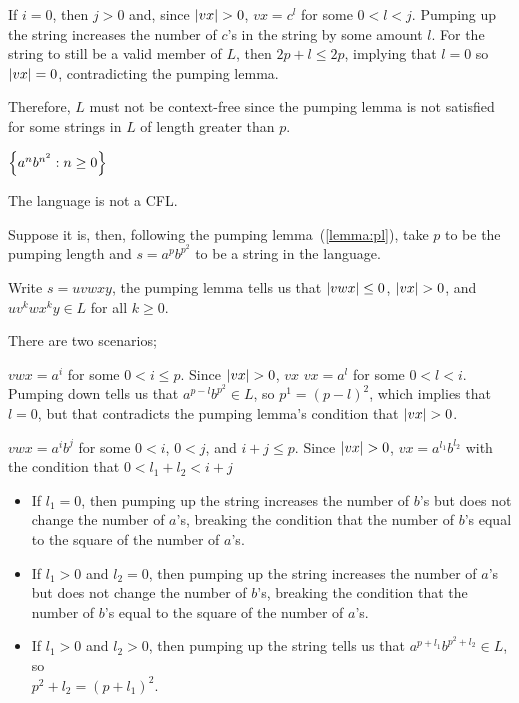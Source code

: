 \begin{problem}
\begin{enumalph}
\begin{Answer}
\begin{enumroman}
        \step
        If $i = 0$, then $j > 0$ and, since $\lvert vx\rvert > 0$, $vx = c^l$ for some
        $0 < l < j$.
        Pumping up the string increases the number of $c$'s in the string by some
        amount $l$. For the string to still be a valid member of $L$,
        then $2p + l \leq 2p$, implying that $l = 0$ so $\lvert vx\rvert = 0$,
        contradicting the pumping lemma.
      \end{enumroman}

      \step
      Therefore, $L$ must not be context-free since the pumping lemma
      is not satisfied for some strings in $L$ of length greater than $p$.
    \end{Answer}
    
    \newpage
    \item $\left\{a^n b^{n^2} : n \ge 0\right\}$
    \begin{Answer}
      The language is not a CFL.

      Suppose it is, then, following the pumping lemma~(\ref{lemma:pl}),
      take $p$ to be the pumping length and $s = a^pb^{p^2}$
      to be a string in the language.

      Write $s = uvwxy$, the pumping lemma tells us that $\lvert vwx\rvert \leq 0$,
      $\lvert vx\rvert > 0$, and $uv^kwx^ky \in L$ for all $k \geq 0$.

      There are two scenarios;
      \begin{enumroman}
        \item $vwx = a^i$ for some $0 < i \leq p$.
          Since $\lvert vx\rvert > 0$, $vx$ $vx = a^l$ for some $0 < l < i$.
          Pumping down tells us that $a^{p-l}b^{p^2} \in L$,
          so $p^1 = (p - l)^2$, which implies that $l = 0$,
          but that contradicts the pumping lemma's condition that
          $\lvert vx\rvert > 0$.
        \item $vwx = a^ib^j$ for some $0 < i$, $0 < j$, and $i + j \leq p$.
          Since $\lvert vx\rvert > 0$, $vx = a^{l_1}b^{l_2}$ with the condition
          that $0 < l_1 + l_2 < i + j$
          
          \begin{itemize}
            \item If $l_1 = 0$, then pumping up the string increases the number of $b$'s
              but does not change the number of $a$'s, breaking the condition
              that the number of $b$'s equal to the square of the number of $a$'s.
            \item If $l_1 > 0$ and $l_2 = 0$, then pumping up the string
              increases the number of $a$'s but does not change the number of $b$'s,
              breaking the condition that the number of $b$'s equal to the square
              of the number of $a$'s.
            \item If $l_1 > 0$ and $l_2 > 0$, then pumping up the string tells us that
              $a^{p+l_1}b^{p^2+l_2} \in L$, so \\ $p^2 + l_2 = (p + l_1)^2$.
    

\end{itemize}
\end{enumroman}
\end{Answer}
\end{enumalph}
\end{problem}

